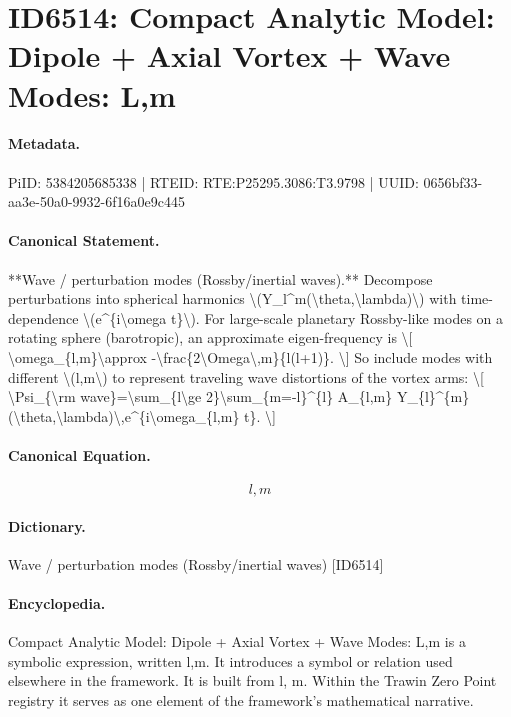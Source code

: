 \section*{ID6514: Compact Analytic Model: Dipole + Axial Vortex + Wave Modes: L,m}
\paragraph{Metadata.}
PiID: 5384205685338 | RTEID: RTE:P25295.3086:T3.9798 | UUID: 0656bf33-aa3e-50a0-9932-6f16a0e9c445

\paragraph{Canonical Statement.}
**Wave / perturbation modes (Rossby/inertial waves).** Decompose perturbations into spherical harmonics \textbackslash{}(Y\_l\textasciicircum{}m(\textbackslash{}theta,\textbackslash{}lambda)\textbackslash{}) with time-dependence \textbackslash{}(e\textasciicircum{}\{i\textbackslash{}omega t\}\textbackslash{}). For large-scale planetary Rossby-like modes on a rotating sphere (barotropic), an approximate eigen-frequency is \textbackslash{}[ \textbackslash{}omega\_\{l,m\}\textbackslash{}approx -\textbackslash{}frac\{2\textbackslash{}Omega\textbackslash{},m\}\{l(l+1)\}. \textbackslash{}] So include modes with different \textbackslash{}(l,m\textbackslash{}) to represent traveling wave distortions of the vortex arms: \textbackslash{}[ \textbackslash{}Psi\_\{\textbackslash{}rm wave\}=\textbackslash{}sum\_\{l\textbackslash{}ge 2\}\textbackslash{}sum\_\{m=-l\}\textasciicircum{}\{l\} A\_\{l,m\} Y\_\{l\}\textasciicircum{}\{m\}(\textbackslash{}theta,\textbackslash{}lambda)\textbackslash{},e\textasciicircum{}\{i\textbackslash{}omega\_\{l,m\} t\}. \textbackslash{}]

\paragraph{Canonical Equation.}
\[
l,m
\]

\paragraph{Dictionary.}
Wave / perturbation modes (Rossby/inertial waves) [ID6514]

\paragraph{Encyclopedia.}
Compact Analytic Model: Dipole + Axial Vortex + Wave Modes: L,m is a symbolic expression, written l,m. It introduces a symbol or relation used elsewhere in the framework. It is built from l, m. Within the Trawin Zero Point registry it serves as one element of the framework's mathematical narrative.
